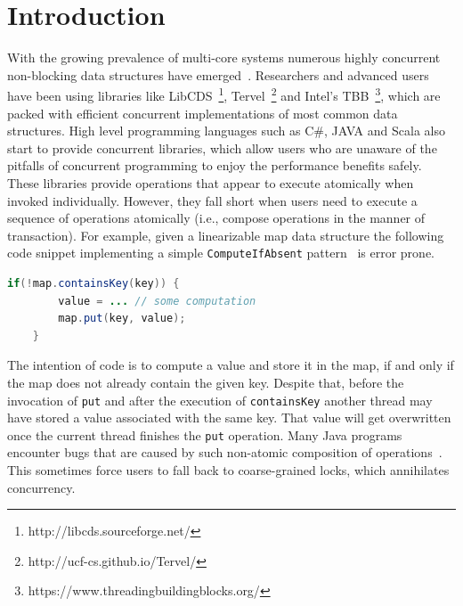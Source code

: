 \documentclass[10pt,conference,compsocconf]{IEEEtran}
\begin{document}
\section{Introduction}
\label{sec:intro}
With the growing prevalence of multi-core systems numerous highly concurrent non-blocking data structures have emerged~\cite{linden2013skiplist,ellen2010non,braginsky2012lock,zhang2015lockfree,michael2002high}.
Researchers and advanced users have been using libraries like LibCDS~\footnote{http://libcds.sourceforge.net/}, Tervel~\footnote{http://ucf-cs.github.io/Tervel/} and Intel's TBB~\footnote{https://www.threadingbuildingblocks.org/}, which are packed with efficient concurrent implementations of most common data structures.
High level programming languages such as C\#, JAVA and Scala also start to provide concurrent libraries, which allow users who are unaware of the pitfalls of concurrent programming to enjoy the performance benefits safely.
These libraries provide operations that appear to execute atomically when invoked individually.
However, they fall short when users need to execute a sequence of operations atomically (i.e., compose operations in the manner of transaction).
For example, given a linearizable map data structure the following code snippet implementing a simple \texttt{ComputeIfAbsent} pattern~\cite{golan2013concurrent} is error prone.
\begin{lstlisting}[basicstyle=\small,language=JAVA]
    if(!map.containsKey(key)) {
        value = ... // some computation
        map.put(key, value);
    }
\end{lstlisting}
The intention of code is to compute a value and store it in the map, if and only if the map does not already contain the given key.
Despite that, before the invocation of \texttt{put} and after the execution of \texttt{containsKey} another thread may have stored a value associated with the same key.
That value will get overwritten once the current thread finishes the \texttt{put} operation. 
Many Java programs encounter bugs that are caused by such non-atomic composition of operations~\cite{shacham2011testing}.
This sometimes force users to fall back to coarse-grained locks, which annihilates concurrency.
\end{document}
